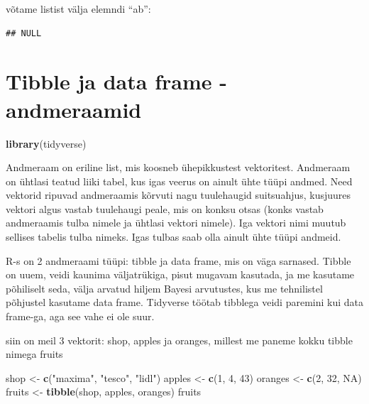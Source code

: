 \documentclass[]{book}
\newenvironment{Shaded}{\begin{snugshade}}{\end{snugshade}}
\newcommand{\KeywordTok}[1]{\textcolor[rgb]{0.13,0.29,0.53}{\textbf{#1}}}
\newcommand{\DecValTok}[1]{\textcolor[rgb]{0.00,0.00,0.81}{#1}}
\newcommand{\StringTok}[1]{\textcolor[rgb]{0.31,0.60,0.02}{#1}}
\newcommand{\OtherTok}[1]{\textcolor[rgb]{0.56,0.35,0.01}{#1}}
\newcommand{\OperatorTok}[1]{\textcolor[rgb]{0.81,0.36,0.00}{\textbf{#1}}}
\newcommand{\NormalTok}[1]{#1}
\begin{document}
võtame listist välja elemndi ``ab'':

\begin{Shaded}
\end{Shaded}

\begin{verbatim}
## NULL
\end{verbatim}

\section{Tibble ja data frame -
andmeraamid}\label{tibble-ja-data-frame---andmeraamid}

\begin{Shaded}
\begin{Highlighting}[]
\KeywordTok{library}\NormalTok{(tidyverse)}
\end{Highlighting}
\end{Shaded}

Andmeraam on eriline list, mis koosneb ühepikkustest vektoritest.
Andmeraam on ühtlasi teatud liiki tabel, kus igas veerus on ainult ühte
tüüpi andmed. Need vektorid ripuvad andmeraamis kõrvuti nagu tuulehaugid
suitsuahjus, kusjuures vektori algus vastab tuulehaugi peale, mis on
konksu otsas (konks vastab andmeraamis tulba nimele ja ühtlasi vektori
nimele). Iga vektori nimi muutub sellises tabelis tulba nimeks. Igas
tulbas saab olla ainult ühte tüüpi andmeid.

R-s on 2 andmeraami tüüpi: tibble ja data frame, mis on väga sarnased.
Tibble on uuem, veidi kaunima väljatrükiga, pisut mugavam kasutada, ja
me kasutame põhiliselt seda, välja arvatud hiljem Bayesi arvutustes, kus
me tehnilistel põhjustel kasutame data frame. Tidyverse töötab tibblega
veidi paremini kui data frame-ga, aga see vahe ei ole suur.

siin on meil 3 vektorit: shop, apples ja oranges, millest me paneme
kokku tibble nimega fruits

\begin{Shaded}
\begin{Highlighting}[]
\NormalTok{shop <-}\StringTok{ }\KeywordTok{c}\NormalTok{(}\StringTok{"maxima"}\NormalTok{, }\StringTok{"tesco"}\NormalTok{, }\StringTok{"lidl"}\NormalTok{)}
\NormalTok{apples <-}\StringTok{ }\KeywordTok{c}\NormalTok{(}\DecValTok{1}\NormalTok{, }\DecValTok{4}\NormalTok{, }\DecValTok{43}\NormalTok{)}
\NormalTok{oranges <-}\StringTok{ }\KeywordTok{c}\NormalTok{(}\DecValTok{2}\NormalTok{, }\DecValTok{32}\NormalTok{, }\OtherTok{NA}\NormalTok{)}
\NormalTok{fruits <-}\StringTok{ }\KeywordTok{tibble}\NormalTok{(shop, apples, oranges)}
\NormalTok{fruits}
\end{Highlighting}
\end{Shaded}
\end{document}
